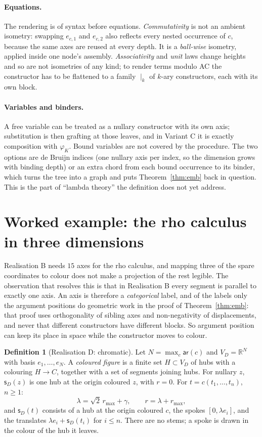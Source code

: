 \documentclass[11pt]{article}
\theoremstyle{definition}
\newtheorem{definition}[theorem]{Definition}
\theoremstyle{remark}
\newcommand{\R}{\mathbb{R}}
\newcommand{\ar}{\mathsf{ar}}
\newcommand{\sh}{\mathsf{s}}
\newcommand{\rad}{r}
\begin{document}
\paragraph{Equations.} The rendering is of syntax before equations.
\emph{Commutativity} is not an ambient isometry: swapping $e_{c,1}$ and $e_{c,2}$
also reflects every nested occurrence of $c$, because the same axes are reused at
every depth. It is a \emph{ball-wise} isometry, applied inside one node's
assembly. \emph{Associativity} and \emph{unit} laws change heights and so are not
isometries of any kind; to render terms modulo AC the constructor has to be
flattened to a family $\mid_k$ of $k$-ary constructors, each with its own block.

\paragraph{Variables and binders.} A free variable can be treated as a nullary
constructor with its own axis; substitution is then grafting at those leaves, and
in Variant C it is exactly composition with $\varphi_K$. Bound variables are not
covered by the procedure. The two options are de Bruijn indices (one nullary axis
per index, so the dimension grows with binding depth) or an extra chord from each
bound occurrence to its binder, which turns the tree into a graph and puts
Theorem~\ref{thm:emb} back in question. This is the part of ``lambda theory'' the
definition does not yet address.

\section{Worked example: the rho calculus in three dimensions}\label{sec:rho}

Realisation B needs $15$ axes for the rho calculus, and mapping three of the
spare coordinates to colour does not make a projection of the rest legible. The
observation that resolves this is that in Realisation B every segment is parallel
to exactly one axis. An axis is therefore a \emph{categorical} label, and of the
labels only the argument positions do geometric work in the proof of
Theorem~\ref{thm:emb}: that proof uses orthogonality of sibling axes and
non-negativity of displacements, and never that different constructors have
different blocks. So argument position can keep its place in space while the
constructor moves to colour.

\begin{definition}[Realisation D: chromatic]\label{def:D}
Let $N=\max_c\ar(c)$ and $V_D=\R^N$ with basis $e_1,\dots,e_N$. A
\emph{coloured figure} is a finite set $H\subset V_D$ of hubs with a colouring
$H\to C$, together with a set of segments joining hubs. For nullary $z$,
$\sh_D(z)$ is one hub at the origin coloured $z$, with $\rad=0$. For
$t=c(t_1,\dots,t_n)$, $n\ge1$:
\[
\lambda=\sqrt2\,\rad_{\max}+\gamma,\qquad \rad=\lambda+\rad_{\max},
\]
and $\sh_D(t)$ consists of a hub at the origin coloured $c$, the spokes
$[0,\lambda e_i]$, and the translates $\lambda e_i+\sh_D(t_i)$ for $i\le n$.
There are no stems; a spoke is drawn in the colour of the hub it leaves.
\end{definition}
\end{document}
